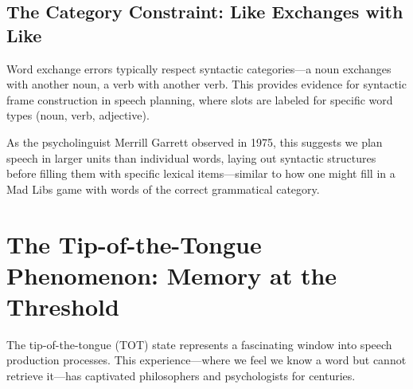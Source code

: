 \documentclass[12pt,a4paper]{article}
\begin{document}
\subsection{The Category Constraint: Like Exchanges with Like}

Word exchange errors typically respect syntactic categories—a noun exchanges with another noun, a verb with another verb. This provides evidence for syntactic frame construction in speech planning, where slots are labeled for specific word types (noun, verb, adjective).

As the psycholinguist Merrill Garrett observed in 1975, this suggests we plan speech in larger units than individual words, laying out syntactic structures before filling them with specific lexical items—similar to how one might fill in a Mad Libs game with words of the correct grammatical category.

\begin{tcolorbox}[title=The Category Constraint in Action]
\begin{center}
\end{center}
\end{tcolorbox}

\section{The Tip-of-the-Tongue Phenomenon: Memory at the Threshold}

The tip-of-the-tongue (TOT) state represents a fascinating window into speech production processes. This experience—where we feel we know a word but cannot retrieve it—has captivated philosophers and psychologists for centuries.
\end{document}

